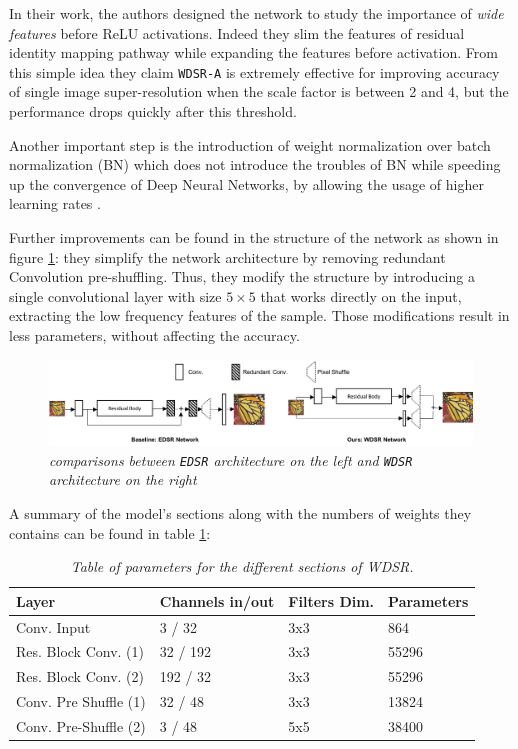\documentclass[12pt,a4paper]{report}
\begin{document}
In their work, the authors designed the network to study the importance of {\it wide features} before ReLU activations. Indeed they slim the features of residual identity mapping pathway while expanding the features before activation.
From this simple idea they claim {\tt WDSR-A} is extremely effective for improving accuracy of single image super-resolution when the scale factor is between 2 and 4, but the performance drops quickly after this threshold.

Another important step is the introduction of weight normalization over batch normalization (BN) which does not introduce the troubles of BN while speeding up the convergence of Deep Neural Networks, by allowing the usage of higher learning rates \cite{wdsr}.

Further improvements can be found in the structure of the network as shown in figure \ref{fig:edsr-wdsr-structure}: they simplify the network architecture by removing redundant Convolution pre-shuffling. 
Thus, they modify the structure by introducing a single convolutional layer with size $5  \times 5$ that works directly on the input, extracting the low frequency features of the sample. 
Those modifications result in less parameters, without affecting the accuracy.

\begin{figure}[H]
 \centering
 \includegraphics[scale=0.6]{./images/edsr_wdsr_structure.png}
 \caption{\it comparisons between {\tt EDSR} architecture on the left and {\tt WDSR} architecture on the right}
 \label{fig:edsr-wdsr-structure}
\end{figure}

A summary of the model's sections along with the numbers of weights they contains can be found in table \ref{tab:wdsr-weights}: 

\begin{table}[H]
\begin{center}
\setlength{\tabcolsep}{14pt}
\begin{tabular}{|l l l l|}
 \hline
 Layer & Channels in/out & Filters Dim. & Parameters \\
 \hline
 Conv. Input           & 3 / 32   & 3x3 & 864  \\[0.3cm]
 Res. Block Conv. (1)  & 32 / 192 & 3x3 & 55296\\[0.3cm]
 Res. Block Conv. (2)  & 192 / 32 & 3x3 & 55296\\[0.3CM]
 Conv. Pre Shuffle (1) & 32 / 48  & 3x3 & 13824\\[0.3cm]
 Conv. Pre-Shuffle (2) & 3 / 48   & 5x5 & 38400\\
 \hline
\end{tabular}
\end{center}
\label{tab:wdsr-weights}
\caption{\it Table of parameters for the different sections of WDSR.}
\end{table}
\end{document}
